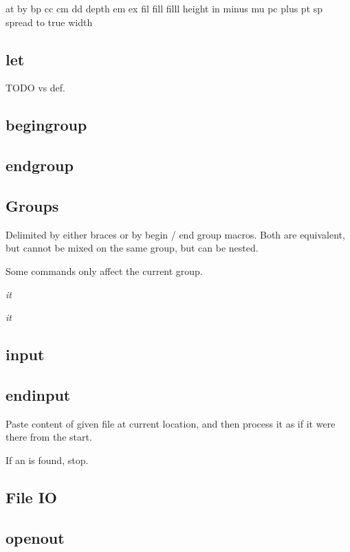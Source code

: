     at by bp cc cm dd depth em ex fil fill filll height in minus mu pc plus pt sp spread to true width

  \subsection{let}

    TODO vs def.

  \subsection{begingroup}

  \subsection{endgroup}

  \subsection{Groups}

    Delimited by either braces \bo \bc or by begin / end group macros. Both are equivalent, but cannot be mixed on the same group, but can be nested.

    Some commands only affect the current group.

    {\it it}

    \begingroup\it it\endgroup

  \subsection{input}

  \subsection{endinput}

    Paste content of given file at current location, and then process it as if it were there from the start.

    If an  is found, stop.

    

  \subsection{File IO}

  \subsection{openout}

